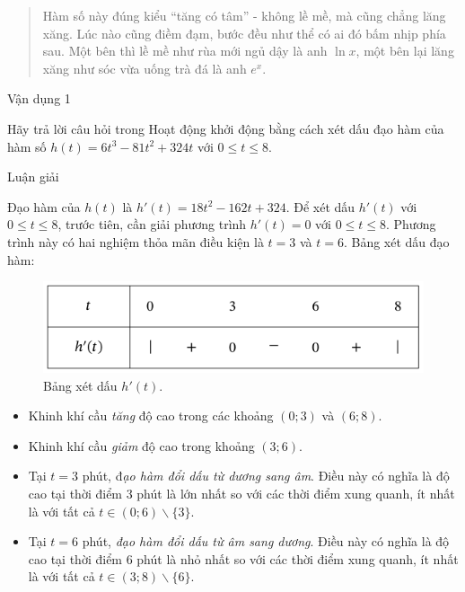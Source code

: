 \documentclass[
]{article}
\providecommand{\tightlist}{%
  \setlength{\itemsep}{0pt}\setlength{\parskip}{0pt}}\usepackage{longtable,booktabs,array}
\begin{document}
\begin{tcolorbox}
{\begin{footnotesize}
\begin{tcolorbox}
\begin{itemize}
  \begin{quote}
  Hàm số này đúng kiểu ``tăng có tâm'' - không lề mề, mà cũng chẳng lăng
  xăng. Lúc nào cũng điềm đạm, bước đều như thể có ai đó bấm nhịp phía
  sau. Một bên thì lề mề như rùa mới ngủ dậy là anh \(\ln x\), một bên
  lại lăng xăng như sóc vừa uống trà đá là anh \(e^x\).
  \end{quote}
\end{itemize}

\end{tcolorbox}

\end{footnotesize}}

Vận dụng 1

Hãy trả lời câu hỏi trong Hoạt động khởi động bằng cách xét dấu đạo hàm
của hàm số \(h(t)=6t^3-81t^2+324t\) với \(0\leq t\leq 8\).

Luận giải

Đạo hàm của \(h(t)\) là \(h'(t)=18t^2-162t+324\). Để xét dấu \(h'(t)\)
với \(0\leq t\leq 8\), trước tiên, cần giải phương trình \(h'(t)=0\) với
\(0\leq t\leq 8\). Phương trình này có hai nghiệm thỏa mãn điều kiện là
\(t=3\) và \(t=6\). Bảng xét dấu đạo hàm:

\begin{figure}[H]

{\centering \includegraphics[width=0.6\linewidth,height=\textheight,keepaspectratio]{../../../../../../../figures/toan-thpt/toan-12/chan-troi/sach-giao-khoa/chuong-1/bai-1/vd1-bang-xet-dau-dh.pdf}

}

\caption{Bảng xét dấu \(h'(t)\).}

\end{figure}%

\begin{itemize}
\tightlist
\item
  Khinh khí cầu \emph{tăng} độ cao trong các khoảng \((0;3)\) và
  \((6;8)\).
\item
  Khinh khí cầu \emph{giảm} độ cao trong khoảng \((3;6)\).
\item
  Tại \(t=3\) phút, đ\emph{ạo hàm đổi dấu từ dương sang âm}. Điều này có
  nghĩa là độ cao tại thời điểm 3 phút là lớn nhất so với các thời điểm
  xung quanh, ít nhất là với tất cả \(t\in(0;6)\backslash\{3\}\).
\item
  Tại \(t=6\) phút, \emph{đạo hàm đổi dấu từ âm sang dương}. Điều này có
  nghĩa là độ cao tại thời điểm 6 phút là nhỏ nhất so với các thời điểm
  xung quanh, ít nhất là với tất cả \(t\in(3;8)\backslash\{6\}\).
\end{itemize}


\end{tcolorbox}
\end{document}
